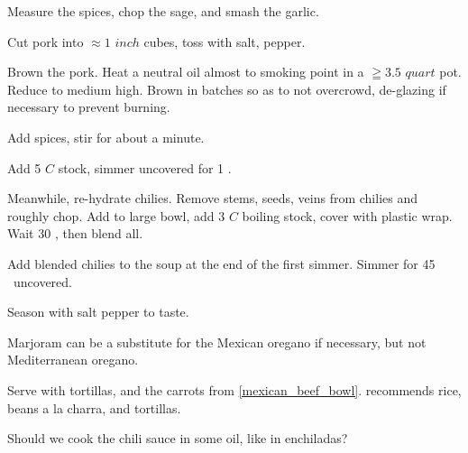 \begin{preparation}
\item Measure the spices, chop the sage, and smash the garlic.

\item Cut pork into $\approx1$ $inch$ cubes, toss with salt, pepper.

\item Brown the pork.
	Heat a neutral oil almost to smoking point in a $ \geqq 3.5$ $quart$ pot.
	Reduce to medium high.
	Brown in batches so as to not overcrowd, de-glazing if necessary to prevent burning.

\item Add spices, stir for about a minute.

\item Add 5 $C$ stock, simmer uncovered for 1 \hour.

\item Meanwhile, re-hydrate chilies.
	Remove stems, seeds, veins from chilies and roughly chop.
	Add to large bowl, add 3 $C$ boiling stock, cover with plastic wrap.
	Wait 30 \minute, then blend all.

\item Add blended chilies to the soup at the end of the first simmer.
	Simmer for 45 \minute~uncovered.

\item Season with salt pepper to taste.
\end{preparation}


\begin{variation}
\item Marjoram can be a substitute for the Mexican oregano if necessary, but not Mediterranean oregano.

\item Serve with tortillas, and the carrots from  \ref{mexican_beef_bowl}.  \citeauthor{rMartinez2015} recommends rice, beans a la charra, and tortillas.
\end{variation}


\begin{experiments}
\item Should we cook the chili sauce in some oil, like in enchiladas?
\end{experiments}

\recipeend

